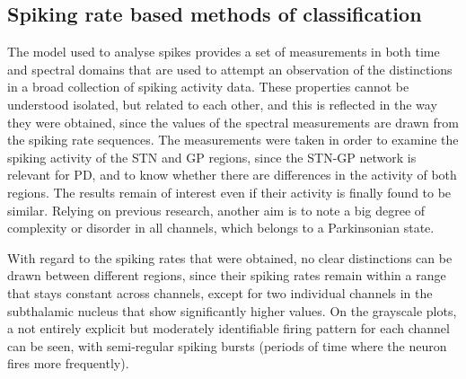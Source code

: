 \documentclass{article}
\begin{document}
\subsection{Spiking rate based methods of classification}

The model used to analyse spikes provides a set of measurements in both time and spectral domains that are used to attempt an observation of the distinctions in a broad collection of spiking activity data. These properties cannot be understood isolated, but related to each other, and this is reflected in the way they were obtained, since the values of the spectral measurements are drawn from the spiking rate sequences. The measurements were taken in order to examine the spiking activity of the STN and GP regions, since the STN-GP network is relevant for PD, and to know whether there are differences in the activity of both regions. The results remain of interest even if their activity is finally found to be similar. Relying on previous research, another aim is to note a big degree of complexity or disorder in all channels, which belongs to a Parkinsonian state.

With regard to the spiking rates that were obtained, no clear distinctions can be drawn between different regions, since their spiking rates remain within a range that stays constant across channels, except for two individual channels in the subthalamic nucleus that show significantly higher values. On the grayscale plots, a not entirely explicit but moderately identifiable firing pattern for each channel can be seen, with semi-regular spiking bursts (periods of time where the neuron fires more frequently). 
\end{document}
